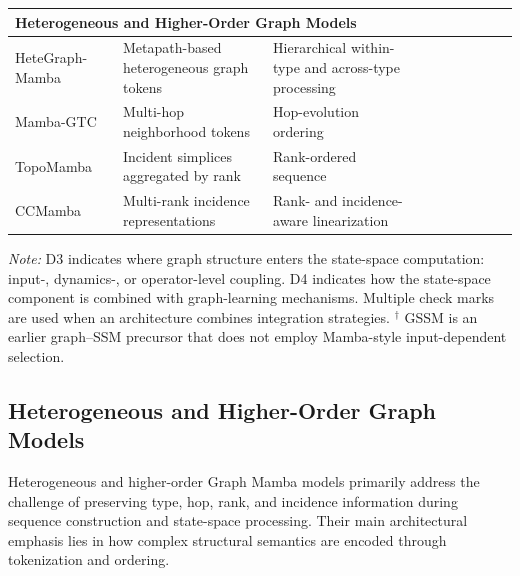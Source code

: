 \documentclass[acmsmall]{acmart}
\newcommand{\cmark}{\ding{51}}
\begin{document}
\begin{table}[h]
{\begin{tabular}{@{}
p{2.2cm}
p{3.6cm}
p{3.6cm}
ccc
cccc
@{}}
\midrule
\multicolumn{10}{l}{\textbf{Heterogeneous and Higher-Order Graph Models}} \\
\midrule

HeteGraph-Mamba~\cite{pan2024hetegraph} &
Metapath-based heterogeneous graph tokens &
Hierarchical within-type and across-type processing &
\cmark & & &
\cmark & & & \\

Mamba-GTC~\cite{Meng2026Mamba-GTC} &
Multi-hop neighborhood tokens &
Hop-evolution ordering &
\cmark & & &
& & \cmark & \\

TopoMamba~\cite{montagna2024topological} &
Incident simplices aggregated by rank &
Rank-ordered sequence &
\cmark & & &
\cmark & & & \\

CCMamba~\cite{chen2026ccmamba} &
Multi-rank incidence representations &
Rank- and incidence-aware linearization &
\cmark & & &
\cmark & & & \\

\bottomrule

\end{tabular}%
}


\vspace{1mm}
\begin{minipage}{0.98\textwidth}
\footnotesize
\textit{Note:} D3 indicates where graph structure enters the state-space
computation: input-, dynamics-, or operator-level coupling.
D4 indicates how the state-space component is combined with graph-learning
mechanisms. Multiple check marks are used when an architecture combines
integration strategies.
$^\dagger$ GSSM is an earlier graph--SSM precursor that does not employ
Mamba-style input-dependent selection.
\end{minipage}


\end{table}


\subsection{Heterogeneous and Higher-Order Graph Models}
\label{subsec:heterogeneous-higherorder}

Heterogeneous and higher-order Graph Mamba models primarily address the challenge of preserving type, hop, rank, and incidence information during sequence construction and state-space processing. Their main architectural emphasis lies in how complex structural semantics are encoded through tokenization and ordering.
\end{document}

